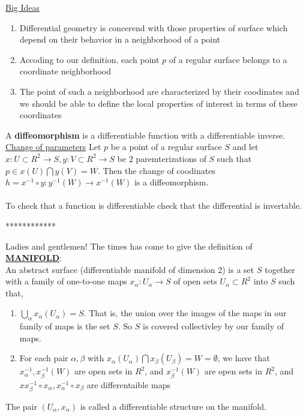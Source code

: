 \documentclass[12pt,letterpaper]{hmcpset}
\begin{document}
\underline{Big Ideas}
\begin{enumerate}[label=\arabic*]
\item Differential geometry is concerend with those properties of surface which
  depend on their behavior in a neighborhood of a point
\item Accoding to our definition, each point $p$ of a regular surface belongs to
  a coordinate neighborhood
\item The point of such a neighborhood are characterized by their coodinates and
  we should be able to define the local properties of interest in terms of these coordinates
\end{enumerate}

A \textbf{diffeomorphism} is a differentiable function with a differentiable
inverse. \\

\underline{Change of parameters}
Let $p$ be a point of a regular surface $S$ and let $x: U \subset R^2 \rightarrow S, y: V \subset R^2
\rightarrow S$
be 2 paremterizations of $S$ such that $p \in x(U) \bigcap y(V) = W$. Then the change of
coodinates $h = x^{-1} \circ y: y^{-1}(W) \rightarrow x^{-1}(W)$ is a diffeomorphism. \\\\

To check that a function is differentiable check that the differential is
invertable. \\
\begin{center}
************ 
\end{center}
Ladies and gentlemen! The times has come to give the definition of
\underline{\textbf{MANIFOLD}}: \\
An abstract surface (differentiable manifold of dimension 2) is a set $S$
together with a family of one-to-one maps $x_{\alpha}: U_{\alpha} \rightarrow S$ of open sets $U_\alpha
\subset R^2$ into $S$ such that,
\begin{enumerate}[label=\arabic*]
\item $\bigcup_{\alpha} x_{\alpha}(U_{\alpha}) = S$. That is, the union over the images of the maps
  in our family of maps is the set $S$. So $S$ is covered collectivley by our
  family of maps.
\item For each pair $\alpha, \beta$ with $x_{\alpha}(U_{\alpha})
  \bigcap x_{\beta}(U_{\beta}) = W = \emptyset$, we have that $x_{\alpha}^{-1}, x_{\beta}^{-1}(W)$ are open
  sets in $R^2$, and $x_{\beta}^{-1}(W)$ are open sets in $R^2$, and $xx_{\beta}^{-1} \circ
  x_{\alpha}, x_{\alpha}^{-1} \circ x_{\beta}$ are differentaible maps
\end{enumerate}
The pair $(U_{\alpha}, x_{\alpha})$ is called a differentiable structure on the manifold.
\end{document}
